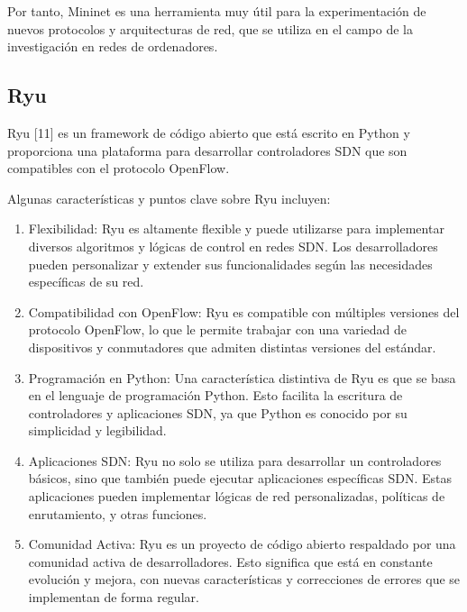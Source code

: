 \documentclass[a4paper, 12pt]{book}
\begin{document}
	
	Por tanto, Mininet es una herramienta muy útil para la experimentación de nuevos protocolos y arquitecturas de red, que se utiliza en el campo de la investigación en redes de ordenadores.
		
	
	
	\subsection{Ryu} 
	\label{sec:ryu}
	
	
	Ryu [11] es un framework de código abierto que está escrito en Python y proporciona una plataforma para desarrollar controladores SDN que son compatibles con el protocolo OpenFlow.
	
	Algunas características y puntos clave sobre Ryu incluyen:
	
	\begin{enumerate}
		
		\item Flexibilidad: Ryu es altamente flexible y puede utilizarse para implementar diversos algoritmos y lógicas de control en redes SDN. Los desarrolladores pueden personalizar y extender sus funcionalidades según las necesidades específicas de su red.
		
		\item Compatibilidad con OpenFlow: Ryu es compatible con múltiples versiones del protocolo OpenFlow, lo que le permite trabajar con una variedad de dispositivos y conmutadores que admiten distintas versiones del estándar.
		
		\item Programación en Python: Una característica distintiva de Ryu es que se basa en el lenguaje de programación Python. Esto facilita la escritura de controladores y aplicaciones SDN, ya que Python es conocido por su simplicidad y legibilidad.
		
		\item Aplicaciones SDN: Ryu no solo se utiliza para desarrollar un controladores básicos, sino que también puede ejecutar aplicaciones específicas SDN. Estas aplicaciones pueden implementar lógicas de red personalizadas, políticas de enrutamiento, y otras funciones.
		
		\item Comunidad Activa: Ryu es un proyecto de código abierto respaldado por una comunidad activa de desarrolladores. Esto significa que está en constante evolución y mejora, con nuevas características y correcciones de errores que se implementan de forma regular.
		
	\end{enumerate}
	
\end{document}
